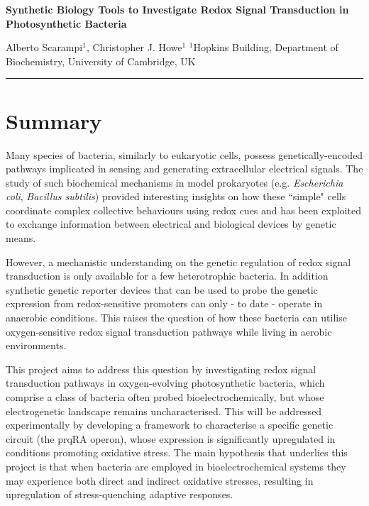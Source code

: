 




\begin{LARGE}
\textbf{Synthetic Biology Tools to Investigate Redox Signal Transduction  in Photosynthetic Bacteria}
\newline
\end{LARGE}
Alberto Scarampi$^{1}$, Christopher J. Howe$^{1}$
\newline
$^{1}$Hopkins Building, Department of Biochemistry, University of Cambridge, UK \\
\noindent\rule{\textwidth}{0.4pt}

\section*{Summary}
Many species of bacteria, similarly to eukaryotic cells, possess genetically-encoded pathways implicated in sensing and generating extracellular electrical signals. The study of such biochemical mechanisms in model prokaryotes (e.g. \textit{Escherichia coli}, \textit{Bacillus subtilis}) provided interesting insights on how these ``simple" cells coordinate complex collective behaviours using redox cues and has been exploited to exchange information between electrical and biological devices by genetic means.

However, a mechanistic understanding on the genetic regulation of redox signal transduction is only available for a few heterotrophic bacteria. In addition synthetic genetic reporter devices that can be used to probe the genetic expression from redox-sensitive promoters can only - to date - operate in anaerobic conditions. This raises the question of how these bacteria can utilise oxygen-sensitive redox signal transduction pathways while living in aerobic environments.

This project aims to address this question by investigating redox signal transduction pathways in oxygen-evolving photosynthetic bacteria, which comprise a class of bacteria often probed bioelectrochemically, but whose electrogenetic landscape remains uncharacterised. 
This will be addressed experimentally by developing a framework to characterise a specific genetic circuit (the prqRA operon), whose expression is significantly upregulated in conditions promoting oxidative stress. 
The main hypothesis that underlies this project is that when bacteria are employed in bioelectrochemical systems they may experience both direct and indirect oxidative stresses, resulting in upregulation of stress-quenching adaptive responses. 

